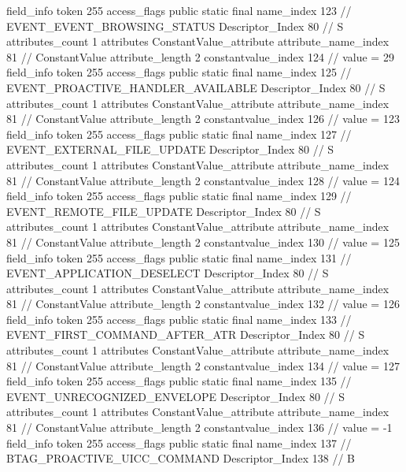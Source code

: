 {{{{{			}
			field_info {
				token	255
				access_flags	public static final
				name_index	123		// EVENT_EVENT_BROWSING_STATUS
				Descriptor_Index	80		// S
				attributes_count	1
				attributes {
				ConstantValue_attribute {
					attribute_name_index	81		// ConstantValue
					attribute_length	2
					constantvalue_index	124		// value = 29
				}
				}
			}
			field_info {
				token	255
				access_flags	public static final
				name_index	125		// EVENT_PROACTIVE_HANDLER_AVAILABLE
				Descriptor_Index	80		// S
				attributes_count	1
				attributes {
				ConstantValue_attribute {
					attribute_name_index	81		// ConstantValue
					attribute_length	2
					constantvalue_index	126		// value = 123
				}
				}
			}
			field_info {
				token	255
				access_flags	public static final
				name_index	127		// EVENT_EXTERNAL_FILE_UPDATE
				Descriptor_Index	80		// S
				attributes_count	1
				attributes {
				ConstantValue_attribute {
					attribute_name_index	81		// ConstantValue
					attribute_length	2
					constantvalue_index	128		// value = 124
				}
				}
			}
			field_info {
				token	255
				access_flags	public static final
				name_index	129		// EVENT_REMOTE_FILE_UPDATE
				Descriptor_Index	80		// S
				attributes_count	1
				attributes {
				ConstantValue_attribute {
					attribute_name_index	81		// ConstantValue
					attribute_length	2
					constantvalue_index	130		// value = 125
				}
				}
			}
			field_info {
				token	255
				access_flags	public static final
				name_index	131		// EVENT_APPLICATION_DESELECT
				Descriptor_Index	80		// S
				attributes_count	1
				attributes {
				ConstantValue_attribute {
					attribute_name_index	81		// ConstantValue
					attribute_length	2
					constantvalue_index	132		// value = 126
				}
				}
			}
			field_info {
				token	255
				access_flags	public static final
				name_index	133		// EVENT_FIRST_COMMAND_AFTER_ATR
				Descriptor_Index	80		// S
				attributes_count	1
				attributes {
				ConstantValue_attribute {
					attribute_name_index	81		// ConstantValue
					attribute_length	2
					constantvalue_index	134		// value = 127
				}
				}
			}
			field_info {
				token	255
				access_flags	public static final
				name_index	135		// EVENT_UNRECOGNIZED_ENVELOPE
				Descriptor_Index	80		// S
				attributes_count	1
				attributes {
				ConstantValue_attribute {
					attribute_name_index	81		// ConstantValue
					attribute_length	2
					constantvalue_index	136		// value = -1
				}
				}
			}
			field_info {
				token	255
				access_flags	public static final
				name_index	137		// BTAG_PROACTIVE_UICC_COMMAND
				Descriptor_Index	138		// B
}}}}}
